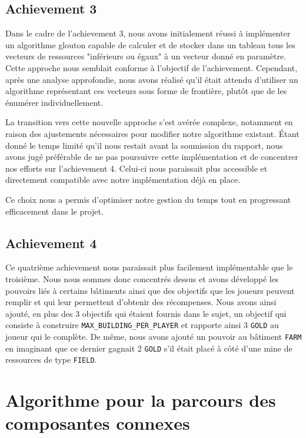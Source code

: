 \documentclass[a4paper,12pt]{report}
\begin{document}
\subsection{Achievement 3}

Dans le cadre de l'achievement 3, nous avons initialement réussi à implémenter un algorithme glouton capable de calculer et de stocker dans un tableau 
tous les vecteurs de ressources "inférieurs ou égaux" à un vecteur donné en paramètre. Cette approche nous semblait conforme à l'objectif de l'achievement. 
Cependant, après une analyse approfondie, nous avons réalisé qu'il était attendu d'utiliser un algorithme représentant ces vecteurs sous forme de frontière, 
plutôt que de les énumérer individuellement.

La transition vers cette nouvelle approche s'est avérée complexe, notamment en raison des ajustements nécessaires pour modifier notre algorithme existant. 
Étant donné le temps limité qu'il nous restait avant la soumission du rapport, nous avons jugé préférable de ne pas poursuivre cette implémentation et de 
concentrer nos efforts sur l'achievement 4. Celui-ci nous paraissait plus accessible et directement compatible avec notre implémentation déjà en place.

Ce choix nous a permis d'optimiser notre gestion du temps tout en progressant efficacement dans le projet.

\subsection{Achievement 4} \label{achiev4}
Ce quatrième achievement nous paraissait plus facilement implémentable que le troisième. Nous nous sommes donc concentrés dessus et avons développé les pouvoirs liés à certains bâtiments ainsi que des objectifs que les joueurs peuvent remplir et qui leur permettent d'obtenir des récompenses. Nous avons ainsi ajouté, en plus des 3 objectifs qui étaient fournis dans le sujet, un objectif qui consiste à construire \texttt{MAX\_BUILDING\_PER\_PLAYER} et rapporte ainsi 3 \texttt{GOLD} au joueur qui le complète.
De même, nous avons ajouté un pouvoir au bâtiment \texttt{FARM} en imaginant que ce dernier gagnait 2 \texttt{GOLD} s'il était placé à côté d'une mine de ressources de type \texttt{FIELD}.

\section{Algorithme pour la parcours des composantes connexes} \label{algorithme}
\end{document}
